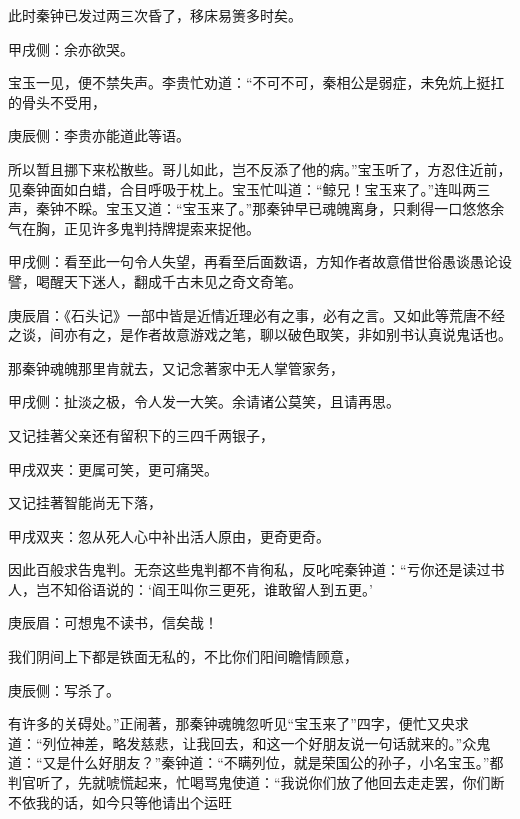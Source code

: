 \begin{parag}
    此时秦钟已发过两三次昏了，移床易箦多时矣。\begin{note}甲戌侧：余亦欲哭。\end{note}宝玉一见，便不禁失声。李贵忙劝道：“不可不可，秦相公是弱症，未免炕上挺扛的骨头不受用，\begin{note}庚辰侧：李贵亦能道此等语。\end{note}所以暂且挪下来松散些。哥儿如此，岂不反添了他的病。”宝玉听了，方忍住近前，见秦钟面如白蜡，合目呼吸于枕上。宝玉忙叫道：“鲸兄！宝玉来了。”连叫两三声，秦钟不睬。宝玉又道：“宝玉来了。”那秦钟早已魂魄离身，只剩得一口悠悠余气在胸，正见许多鬼判持牌提索来捉他。\begin{note}甲戌侧：看至此一句令人失望，再看至后面数语，方知作者故意借世俗愚谈愚论设譬，喝醒天下迷人，翻成千古未见之奇文奇笔。\end{note}\begin{note}庚辰眉：《石头记》一部中皆是近情近理必有之事，必有之言。又如此等荒唐不经之谈，间亦有之，是作者故意游戏之笔，聊以破色取笑，非如别书认真说鬼话也。\end{note}那秦钟魂魄那里肯就去，又记念著家中无人掌管家务，\begin{note}甲戌侧：扯淡之极，令人发一大笑。余请诸公莫笑，且请再思。\end{note}又记挂著父亲还有留积下的三四千两银子，\begin{note}甲戌双夹：更属可笑，更可痛哭。\end{note}又记挂著智能尚无下落，\begin{note}甲戌双夹：忽从死人心中补出活人原由，更奇更奇。\end{note}因此百般求告鬼判。无奈这些鬼判都不肯徇私，反叱咤秦钟道：“亏你还是读过书人，岂不知俗语说的：‘阎王叫你三更死，谁敢留人到五更。’\begin{note}庚辰眉：可想鬼不读书，信矣哉！\end{note}我们阴间上下都是铁面无私的，不比你们阳间瞻情顾意，\begin{note}庚辰侧：写杀了。\end{note}有许多的关碍处。”正闹著，那秦钟魂魄忽听见“宝玉来了”四字，便忙又央求道：“列位神差，略发慈悲，让我回去，和这一个好朋友说一句话就来的。”众鬼道：“又是什么好朋友？”秦钟道：“不瞒列位，就是荣国公的孙子，小名宝玉。”都判官听了，先就唬慌起来，忙喝骂鬼使道：“我说你们放了他回去走走罢，你们断不依我的话，如今只等他请出个运旺
\end{parag}
